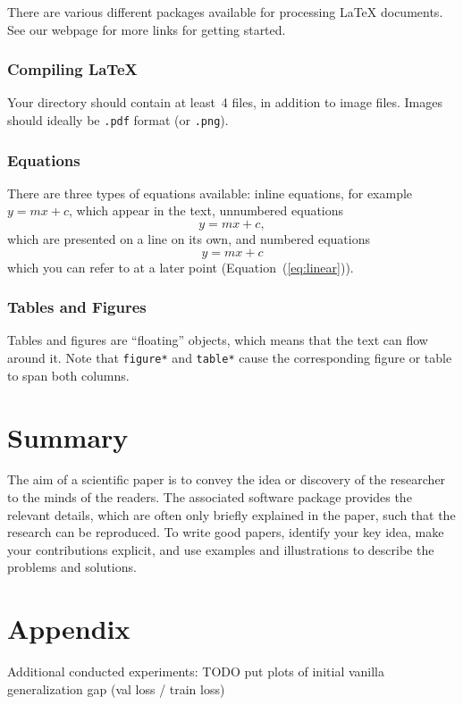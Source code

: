 \documentclass[10pt,conference,compsocconf]{IEEEtran}
\begin{document}
There are various different packages available for processing \LaTeX{}
documents. See our webpage for more links for getting started.

\subsubsection{Compiling \LaTeX{}}
Your directory should contain at least~4 files, in addition to image
files. Images should ideally be
\texttt{.pdf} format (or \texttt{.png}).

\subsubsection{Equations}

There are three types of equations available: inline equations, for
example $y=mx + c$, which appear in the text, unnumbered equations
$$y=mx + c,$$
which are presented on a line on its own, and numbered equations
\begin{equation}
  \label{eq:linear}
  y = mx + c
\end{equation}
which you can refer to at a later point (Equation~(\ref{eq:linear})).

\subsubsection{Tables and Figures}

Tables and figures are ``floating'' objects, which means that the text
can flow around it.
Note that \texttt{figure*} and \texttt{table*} cause the corresponding
figure or table to span both columns.



\section{Summary}

The aim of a scientific paper is to convey the idea or discovery of
the researcher to the minds of the readers. The associated software
package provides the relevant details, which are often only briefly
explained in the paper, such that the research can be reproduced.
To write good papers, identify your key idea, make your contributions
explicit, and use examples and illustrations to describe the problems
and solutions.

\section*{Appendix}
\label{sec:appendix}
Additional conducted experiments:
TODO put plots of initial vanilla generalization gap (val loss / train loss)

\newpage


\end{document}
